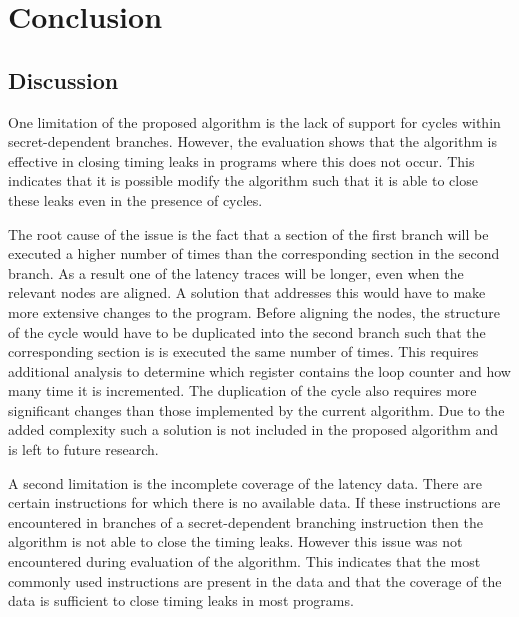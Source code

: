 
\chapter{Conclusion}

\section{Discussion}
One limitation of the proposed algorithm is the lack of support for cycles within secret-dependent branches.
However, the evaluation shows that the algorithm is effective in closing timing leaks in programs where this does not occur. 
This indicates that it is possible modify the algorithm such that it is able to close these leaks even in the presence of cycles. 

The root cause of the issue is the fact that a section of the first branch will be executed a higher number of times than the corresponding section in the second branch. 
As a result one of the latency traces will be longer, even when the relevant nodes are aligned.
A solution that addresses this would have to make more extensive changes to the program. 
Before aligning the nodes, the structure of the cycle would have to be duplicated into the second branch such that the corresponding section is is executed the same number of times. 
This requires additional analysis to determine which register contains the loop counter and how many time it is incremented. 
The duplication of the cycle also requires more significant changes than those implemented by the current algorithm. %
Due to the added complexity such a solution is not included in the proposed algorithm and is left to future research. 

A second limitation is the incomplete coverage of the latency data. There are certain instructions for which there is no available data. 
If these instructions are encountered in branches of  a secret-dependent branching instruction then the algorithm is not able to close the timing leaks. 
However this issue was not encountered during evaluation of the algorithm. 
This indicates that the most commonly used instructions are present in the data and that the coverage of the data is sufficient to close timing leaks in most programs. 

